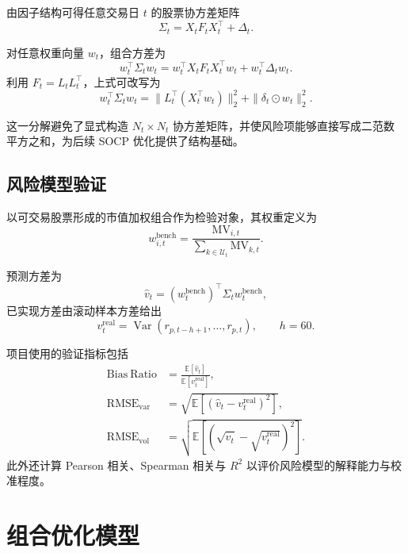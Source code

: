\documentclass[12pt, a4paper, oneside]{article}
\newcommand{\E}{\mathbb{E}}
\newcommand{\Var}{\operatorname{Var}}
\begin{document}
由因子结构可得任意交易日 \(t\) 的股票协方差矩阵
\begin{equation}
\Sigma_t = X_tF_tX_t^\top + \Delta_t.
\end{equation}

对任意权重向量 \(w_t\)，组合方差为
\begin{equation}
w_t^\top\Sigma_tw_t = w_t^\top X_tF_tX_t^\top w_t + w_t^\top \Delta_t w_t.
\end{equation}
利用 \(F_t = L_tL_t^\top\)，上式可改写为
\begin{equation}
w_t^\top\Sigma_tw_t = \|L_t^\top(X_t^\top w_t)\|_2^2 + \|\delta_t \odot w_t\|_2^2.
\end{equation}

这一分解避免了显式构造 \(N_t\times N_t\) 协方差矩阵，并使风险项能够直接写成二范数平方之和，为后续 SOCP 优化提供了结构基础。

\subsection{风险模型验证}

以可交易股票形成的市值加权组合作为检验对象，其权重定义为
\begin{equation}
w_{i,t}^{\mathrm{bench}} = \frac{\mathrm{MV}_{i,t}}{\sum_{k\in\mathcal U_t}\mathrm{MV}_{k,t}}.
\end{equation}

预测方差为
\begin{equation}
\hat v_t = (w_t^{\mathrm{bench}})^\top\Sigma_t w_t^{\mathrm{bench}},
\end{equation}
已实现方差由滚动样本方差给出
\begin{equation}
v_t^{\mathrm{real}} = \Var(r_{p,t-h+1},\dots,r_{p,t}), \qquad h=60.
\end{equation}

项目使用的验证指标包括
\begin{equation}
\begin{aligned}
\mathrm{Bias\ Ratio} &= \frac{\E[\hat v_t]}{\E[v_t^{\mathrm{real}}]}, \\
\mathrm{RMSE}_{\mathrm{var}} &= \sqrt{\E[(\hat v_t - v_t^{\mathrm{real}})^2]}, \\
\mathrm{RMSE}_{\mathrm{vol}} &= \sqrt{\E[(\sqrt{\hat v_t} - \sqrt{v_t^{\mathrm{real}}})^2]}.
\end{aligned}
\end{equation}
此外还计算 Pearson 相关、Spearman 相关与 \(R^2\) 以评价风险模型的解释能力与校准程度。

\section{组合优化模型}
\end{document}
